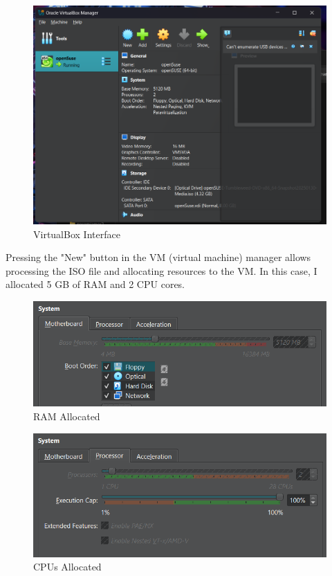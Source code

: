 \documentclass{article}
\begin{document}
\begin{figure}[H]
	\centering
	\includegraphics[width=1\textwidth]{vbx.png}
	\caption{VirtualBox Interface}
	\label{fig:2}
\end{figure}

Pressing the "New" button in the VM (virtual machine) manager allows processing the ISO file and allocating resources to the VM. In this case, I allocated 5 GB of RAM and 2 CPU cores.

\begin{figure}[H]
	\centering
	\includegraphics[width=1\textwidth]{ram.png}
	\caption{RAM Allocated}
	\label{fig:3}
\end{figure}

\begin{figure}[H]
	\centering
	\includegraphics[width=1\textwidth]{core.png}
	\caption{CPUs Allocated}
	\label{fig:4}
\end{figure}
\end{document}
